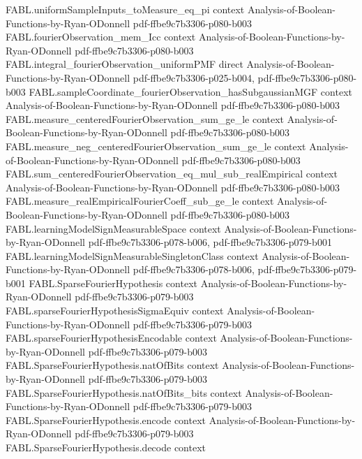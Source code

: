 \begin{theorem}
\proofstep
  {FABL.uniformSampleInputs_toMeasure_eq_pi}
  {context}
  {Analysis-of-Boolean-Functions-by-Ryan-ODonnell}
  {pdf-ffbe9c7b3306-p080-b003}
\proofstep
  {FABL.fourierObservation_mem_Icc}
  {context}
  {Analysis-of-Boolean-Functions-by-Ryan-ODonnell}
  {pdf-ffbe9c7b3306-p080-b003}
\proofstep
  {FABL.integral_fourierObservation_uniformPMF}
  {direct}
  {Analysis-of-Boolean-Functions-by-Ryan-ODonnell}
  {pdf-ffbe9c7b3306-p025-b004,
    pdf-ffbe9c7b3306-p080-b003}
\proofstep
  {FABL.sampleCoordinate_fourierObservation_hasSubgaussianMGF}
  {context}
  {Analysis-of-Boolean-Functions-by-Ryan-ODonnell}
  {pdf-ffbe9c7b3306-p080-b003}
\proofstep
  {FABL.measure_centeredFourierObservation_sum_ge_le}
  {context}
  {Analysis-of-Boolean-Functions-by-Ryan-ODonnell}
  {pdf-ffbe9c7b3306-p080-b003}
\proofstep
  {FABL.measure_neg_centeredFourierObservation_sum_ge_le}
  {context}
  {Analysis-of-Boolean-Functions-by-Ryan-ODonnell}
  {pdf-ffbe9c7b3306-p080-b003}
\proofstep
  {FABL.sum_centeredFourierObservation_eq_mul_sub_realEmpirical}
  {context}
  {Analysis-of-Boolean-Functions-by-Ryan-ODonnell}
  {pdf-ffbe9c7b3306-p080-b003}
\proofstep
  {FABL.measure_realEmpiricalFourierCoeff_sub_ge_le}
  {context}
  {Analysis-of-Boolean-Functions-by-Ryan-ODonnell}
  {pdf-ffbe9c7b3306-p080-b003}
\proofstep
  {FABL.learningModelSignMeasurableSpace}
  {context}
  {Analysis-of-Boolean-Functions-by-Ryan-ODonnell}
  {pdf-ffbe9c7b3306-p078-b006,
    pdf-ffbe9c7b3306-p079-b001}
\proofstep
  {FABL.learningModelSignMeasurableSingletonClass}
  {context}
  {Analysis-of-Boolean-Functions-by-Ryan-ODonnell}
  {pdf-ffbe9c7b3306-p078-b006,
    pdf-ffbe9c7b3306-p079-b001}
\proofstep
  {FABL.SparseFourierHypothesis}
  {context}
  {Analysis-of-Boolean-Functions-by-Ryan-ODonnell}
  {pdf-ffbe9c7b3306-p079-b003}
\proofstep
  {FABL.sparseFourierHypothesisSigmaEquiv}
  {context}
  {Analysis-of-Boolean-Functions-by-Ryan-ODonnell}
  {pdf-ffbe9c7b3306-p079-b003}
\proofstep
  {FABL.sparseFourierHypothesisEncodable}
  {context}
  {Analysis-of-Boolean-Functions-by-Ryan-ODonnell}
  {pdf-ffbe9c7b3306-p079-b003}
\proofstep
  {FABL.SparseFourierHypothesis.natOfBits}
  {context}
  {Analysis-of-Boolean-Functions-by-Ryan-ODonnell}
  {pdf-ffbe9c7b3306-p079-b003}
\proofstep
  {FABL.SparseFourierHypothesis.natOfBits_bits}
  {context}
  {Analysis-of-Boolean-Functions-by-Ryan-ODonnell}
  {pdf-ffbe9c7b3306-p079-b003}
\proofstep
  {FABL.SparseFourierHypothesis.encode}
  {context}
  {Analysis-of-Boolean-Functions-by-Ryan-ODonnell}
  {pdf-ffbe9c7b3306-p079-b003}
\proofstep
  {FABL.SparseFourierHypothesis.decode}
  {context}

\end{theorem}
